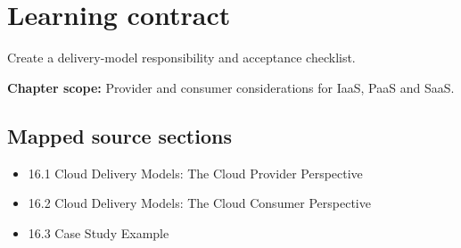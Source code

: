 \documentclass[10pt,letterpaper]{article}
\begin{document}
\sourceStatement
\tableofcontents
\newpage
\section{Learning contract}
\begin{takeaway}
Create a delivery-model responsibility and acceptance checklist.
\end{takeaway}
\textbf{Chapter scope:} Provider and consumer considerations for IaaS, PaaS and SaaS.\\
\subsection{Mapped source sections}
\begin{itemize}
\item 16.1 Cloud Delivery Models: The Cloud Provider Perspective
\item 16.2 Cloud Delivery Models: The Cloud Consumer Perspective
\item 16.3 Case Study Example
\end{itemize}
\end{document}
